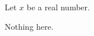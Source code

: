 \begin{theorem}
  Let $x$ be a real number.
\end{theorem}

\begin{bogusenv}
  Nothing here.
\end{bogusenv}
